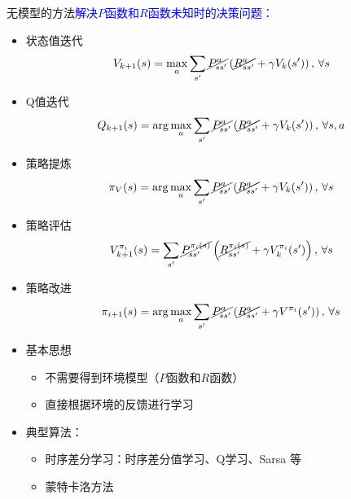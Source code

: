 \begin{note}
    无模型的方法\textcolor{blue}{解决$P$函数和$R$函数未知时的决策问题：}
    \begin{itemize}
        \item 状态值迭代
        \[
            V_{k+1}(s) = \max\limits_{a}\sum\limits_{s'}\cancel{P_{ss'}^a}\left( \cancel{R_{ss'}^{a}}+\gamma V_{k}(s') \right),\,\forall s
        \]
        \item Q值迭代
        \[
            Q_{k+1}(s) = \arg\max\limits_{a}\sum_{s'}\cancel{P_{ss'}^{a}}\left( \cancel{R_{ss'}^a}+\gamma V_k(s') \right),\,\forall s,a
        \]
        \item 策略提炼
        \[
            \pi_{V}(s) = \arg\max\limits_{a}\sum_{s'}\cancel{P_{ss'}^a}\left( \cancel{R_{ss'}^a}+\gamma V_k(s') \right),\,\forall s
        \]
        \item 策略评估
        \[
            V_{k+1}^{\pi_i}(s) = \sum\limits_{s'}\cancel{P_{ss'}^{\pi_i(s)}}\left( \cancel{R_{ss'}^{\pi_i(s)}}+\gamma V_{k}^{\pi_i}(s') \right),\,\forall s
        \]
        \item 策略改进
        \[
            \pi_{i+1}(s) = \arg\max\limits_{a}\sum\limits_{s'}\cancel{P_{ss'}^a}\left( \cancel{R_{ss'}^a}+\gamma V^{\pi_{i}}(s') \right),\,\forall s
        \]
    \end{itemize}
    \begin{itemize}
        \item 基本思想
        \begin{itemize}
            \item 不需要得到环境模型（$P$函数和$R$函数）
            \item 直接根据环境的反馈进行学习
        \end{itemize}
        \item 典型算法：
        \begin{itemize}
            \item 时序差分学习：时序差分值学习、Q学习、Sarsa 等
            \item 蒙特卡洛方法
        \end{itemize}
    \end{itemize}
\end{note}
